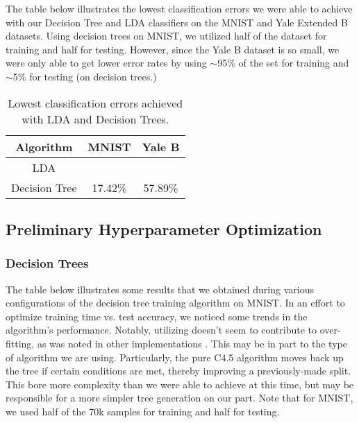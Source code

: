 \label{sec:results}
The table below illustrates the lowest classification errors we were able to achieve with our Decision Tree and LDA classifiers on the MNIST and Yale Extended B datasets. Using decision trees on MNIST, we utilized half of the dataset for training and half for testing. However, since the Yale B dataset is so small, we were only able to get lower error rates by using $\sim$95\% of the set for training and $\sim$5\% for testing (on decision trees.)

\begin{table}[H]
  \centering
  \begin{tabular}{||c | c | c||} 
    \hline
    Algorithm & MNIST & Yale B \\
    \hline\hline
    LDA &  &  \\ 
    \hline
    Decision Tree & 17.42\% & 57.89\% \\ 
    \hline
  \end{tabular}
  \caption{Lowest classification errors achieved with LDA and Decision Trees.}
\end{table}

\subsection{Preliminary Hyperparameter Optimization}

\subsubsection{Decision Trees}

The table below illustrates some results that we obtained during various configurations of the decision tree training algorithm on MNIST. In an effort to optimize training time vs. test accuracy, we noticed some trends in the algorithm's performance. Notably, utilizing  doesn't seem to contribute to over-fitting, as was noted in other implementations \cite{matlab:fitctree}. This may be in part to the type of algorithm we are using. Particularly, the pure C4.5 algorithm moves back up the tree if certain conditions are met, thereby improving a previously-made split. This bore more complexity than we were able to achieve at this time, but may be responsible for a more simpler tree generation on our part. Note that for MNIST, we used half of the 70k samples for training and half for testing.

